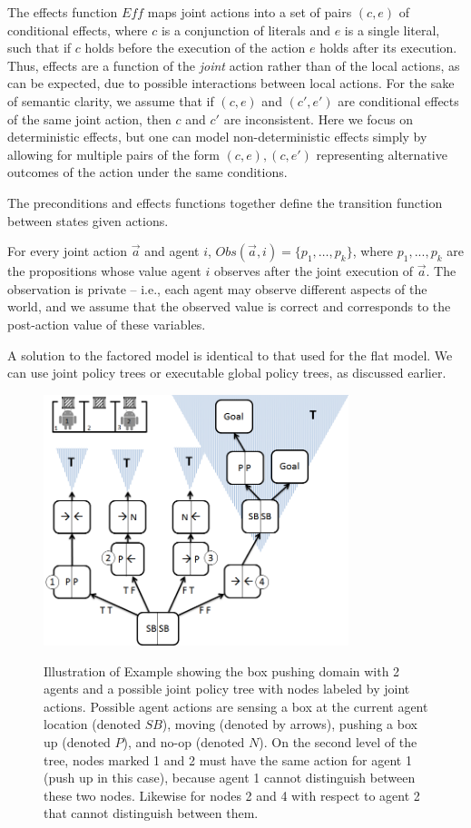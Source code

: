 \documentclass[letterpaper]{article}
\theoremstyle{definition}
\begin{document}
The effects function $\mathit{Eff}$ maps joint actions into a set of pairs $(c,e)$ of conditional effects, where $c$ is a conjunction of literals and $e$ is a single literal, such that if $c$ holds before the execution of the action $e$ holds after its execution. Thus, effects are a function of the {\em joint\/} action rather than of the local actions, as can be expected, due to possible interactions between local actions. For the sake of semantic clarity, we assume that if $(c,e)$ and $(c',e')$ are conditional effects of the same joint action, then $c$ and $c'$ are inconsistent.
Here we focus on deterministic effects, but one can model non-deterministic effects simply by allowing for multiple pairs of the form
$(c,e),(c,e')$ representing alternative outcomes of the action under the same conditions.

The preconditions and effects functions together define the transition function between states given actions.

For every joint action $\vec{a}$ and agent $i$, $\mathit{Obs}(\vec{a},i)=\{p_1,\ldots,p_k\}$, where $p_1,...,p_k$ are the propositions
whose value agent $i$ observes after the joint execution of $\vec{a}$. The observation is private -- i.e., each agent may observe
different aspects of the world, and we assume that the observed value is correct and corresponds to the post-action value of
these variables.


A solution to the factored model is identical to that used for the flat model. We can use joint policy trees or executable global policy trees, as
discussed earlier.


\begin{figure}[t]
\centering
\includegraphics[width=3.5in]{JointPolicyTree.png}
\label{fig:JointPolicyTree}
\caption{\small{Illustration of Example showing the box pushing domain with 2 agents and a possible joint policy tree with nodes labeled by joint actions. Possible agent actions are sensing a box at the current agent location (denoted $SB$), moving (denoted by arrows), pushing a box up (denoted $P$), and no-op (denoted $N$).  On the second level of the tree, nodes marked 1 and 2 must have the same action for agent 1 (push up in this case), because agent 1 cannot distinguish between these two nodes. Likewise for nodes 2 and 4 with respect to agent 2 that cannot distinguish between them.}}
\end{figure}
\end{document}
